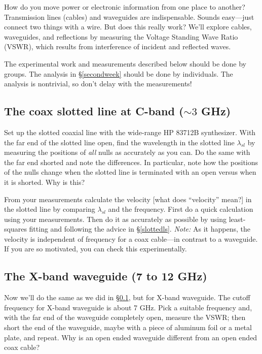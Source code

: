 \documentclass[12pt,preprint]{aastex}
\begin{document}
How do you move power or electronic information from one place to
another? Transmission lines (cables) and waveguides are
indispensable. Sounds easy---just connect two things with a wire. But
does this really work? We'll explore cables, waveguides, and reflections
by measuring the Voltage Standing Wave Ratio (VSWR), which results from
interference of incident and reflected waves.

The experimental work and measurements described below should
be done by groups.  The analysis in \S \ref{secondweek} should be done
by individuals. The analysis is nontrivial, so don't delay with the
measurements!

{\boldmath
\subsection {The coax slotted line at C-band ($\sim 3$ GHz)} \label{slotted}
} Set up the slotted coaxial line with the wide-range HP 83712B
synthesizer.  With the far end of the slotted line open, find the
wavelength in the slotted line $\lambda_{sl}$ by measuring the positions
of {\it all} nulls as accurately as you can.  Do the same with the far
end shorted and note the differences.  In particular, note how the
positions of the nulls change when the slotted line is terminated with
an open versus when it is shorted.  Why is this?

From your measurements calculate the velocity [what does ``velocity''
  mean?] in the slotted line by comparing $\lambda_{sl}$ and the
frequency.  First do a quick calculation using your measurements. Then
do it as accurately as possible by using least-squares fitting and
following the advice in \S \ref{slottedls}.  {\it Note:} As it happens,
the velocity is independent of frequency for a coax cable---in contrast
to a waveguide.  If you are so motivated, you can check this
experimentally.

\subsection {The X-band waveguide (7 to 12 GHz)} \label{waveguide}

Now we'll do the same as we did in \S \ref{slotted}, but for X-band
waveguide.  The cutoff frequency for X-band waveguide is about 7
GHz. Pick a suitable frequency and, with the far end of the waveguide
completely open, measure the VSWR; then short the end of the waveguide,
maybe with a piece of aluminum foil or a metal plate, and repeat.  Why
is an open ended waveguide different from an open ended coax cable?
\end{document}
